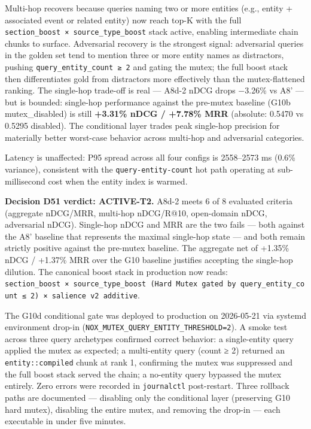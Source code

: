 \documentclass[
]{article}
\begin{document}
Multi-hop recovers because queries naming two or more entities (e.g.,
entity + associated event or related entity) now reach top-K with the
full \texttt{section\_boost\ ×\ source\_type\_boost} stack active,
enabling intermediate chain chunks to surface. Adversarial recovery is
the strongest signal: adversarial queries in the golden set tend to
mention three or more entity names as distractors, pushing
\texttt{query\_entity\_count\ ≥\ 2} and gating the mutex; the full boost
stack then differentiates gold from distractors more effectively than
the mutex-flattened ranking. The single-hop trade-off is real --- A8d-2
nDCG drops −3.26\% vs A8' --- but is bounded: single-hop performance
against the pre-mutex baseline (G10b mutex\_disabled) is still
\textbf{+3.31\% nDCG / +7.78\% MRR} (absolute: 0.5470 vs 0.5295
disabled). The conditional layer trades peak single-hop precision for
materially better worst-case behavior across multi-hop and adversarial
categories.

Latency is unaffected: P95 spread across all four configs is 2558--2573
ms (0.6\% variance), consistent with the \texttt{query-entity-count} hot
path operating at sub-millisecond cost when the entity index is warmed.

\textbf{Decision D51 verdict: ACTIVE-T2.} A8d-2 meets 6 of 8 evaluated
criteria (aggregate nDCG/MRR, multi-hop nDCG/R@10, open-domain nDCG,
adversarial nDCG). Single-hop nDCG and MRR are the two fails --- both
against the A8' baseline that represents the maximal single-hop state
--- and both remain strictly positive against the pre-mutex baseline.
The aggregate net of +1.35\% nDCG / +1.37\% MRR over the G10 baseline
justifies accepting the single-hop dilution. The canonical boost stack
in production now reads:
\texttt{section\_boost\ ×\ source\_type\_boost\ (Hard\ Mutex\ gated\ by\ query\_entity\_count\ ≤\ 2)\ ×\ salience\ v2\ additive}.

The G10d conditional gate was deployed to production on 2026-05-21 via
systemd environment drop-in
(\texttt{NOX\_MUTEX\_QUERY\_ENTITY\_THRESHOLD=2}). A smoke test across
three query archetypes confirmed correct behavior: a single-entity query
applied the mutex as expected; a multi-entity query (count ≥ 2) returned
an \texttt{entity::compiled} chunk at rank 1, confirming the mutex was
suppressed and the full boost stack served the chain; a no-entity query
bypassed the mutex entirely. Zero errors were recorded in
\texttt{journalctl} post-restart. Three rollback paths are documented
--- disabling only the conditional layer (preserving G10 hard mutex),
disabling the entire mutex, and removing the drop-in --- each executable
in under five minutes.
\end{document}
